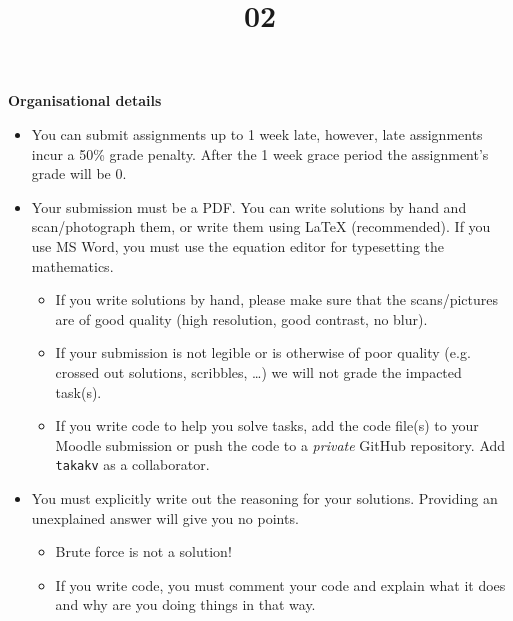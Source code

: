 \documentclass{homework}
\title{02}
\date{\DTMdate{2024-11-15}}
\begin{document}
\maketitle

\textbf{Organisational details}
\begin{itemize}
  \item You can submit assignments up to 1 week late, however, late assignments incur a 50\% grade penalty.
  After the 1 week grace period the assignment's grade will be 0.
  \item Your submission must be a PDF.
  You can write solutions by hand and scan/photograph them, or write them using \LaTeX{} (recommended).
  If you use MS Word, you must use the equation editor for typesetting the mathematics.
  \begin{itemize}
    \item If you write solutions by hand, please make sure that the scans/pictures are of good quality (high resolution, good contrast, no blur).
    \item If your submission is not legible or is otherwise of poor quality (e.g. crossed out solutions, scribbles, \dots) we will not grade the impacted task(s).
    \item If you write code to help you solve tasks, add the code file(s) to your Moodle submission or push the code to a \emph{private} GitHub repository.
    Add \texttt{takakv} as a collaborator.
  \end{itemize}
  \item You must explicitly write out the reasoning for your solutions.
  Providing an unexplained answer will give you no points.
  \begin{itemize}
    \item Brute force is not a solution!
    \item If you write code, you must comment your code and explain what it does and why are you doing things in that way.
  \end{itemize}
\end{itemize}

\vspace*{1em}
\end{document}
